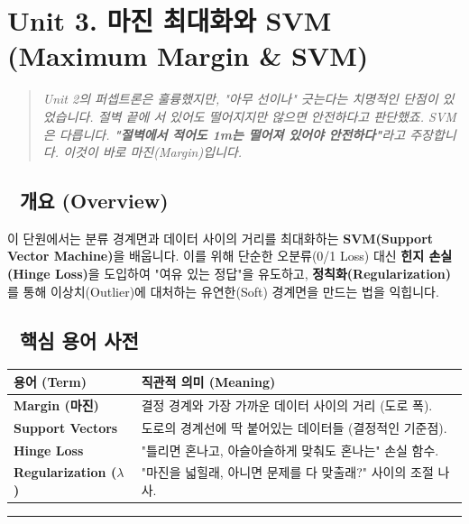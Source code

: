 \documentclass[11pt,a4paper]{book}
\theoremstyle{definition}
\begin{document}
\section{Unit 3. 마진 최대화와 SVM (Maximum Margin \& SVM)}

\begin{quote}
\textit{Unit 2의 퍼셉트론은 훌륭했지만, "아무 선이나" 긋는다는 치명적인 단점이 있었습니다. 절벽 끝에 서 있어도 떨어지지만 않으면 안전하다고 판단했죠. SVM은 다릅니다. \textbf{"절벽에서 적어도 1m는 떨어져 있어야 안전하다"}라고 주장합니다. 이것이 바로 마진(Margin)입니다.}
\end{quote}

\subsection*{📌 개요 (Overview)}
이 단원에서는 분류 경계면과 데이터 사이의 거리를 최대화하는 \textbf{SVM(Support Vector Machine)}을 배웁니다. 이를 위해 단순한 오분류(0/1 Loss) 대신 \textbf{힌지 손실(Hinge Loss)}을 도입하여 "여유 있는 정답"을 유도하고, \textbf{정칙화(Regularization)}를 통해 이상치(Outlier)에 대처하는 유연한(Soft) 경계면을 만드는 법을 익힙니다.

\subsection*{📝 핵심 용어 사전}
\begin{table}[h]
\centering
\begin{tabularx}{\textwidth}{|p{}|X|}
\hline
\textbf{용어 (Term)} & \textbf{직관적 의미 (Meaning)} \\
\hline
\textbf{Margin (마진)} & 결정 경계와 가장 가까운 데이터 사이의 거리 (도로 폭). \\
\hline
\textbf{Support Vectors} & 도로의 경계선에 딱 붙어있는 데이터들 (결정적인 기준점). \\
\hline
\textbf{Hinge Loss} & "틀리면 혼나고, 아슬아슬하게 맞춰도 혼나는" 손실 함수. \\
\hline
\textbf{Regularization ($\lambda$)} & "마진을 넓힐래, 아니면 문제를 다 맞출래?" 사이의 조절 나사. \\
\hline
\end{tabularx}
\end{table}

\vspace{0.5cm}\hrule\vspace{0.5cm}
\end{document}
